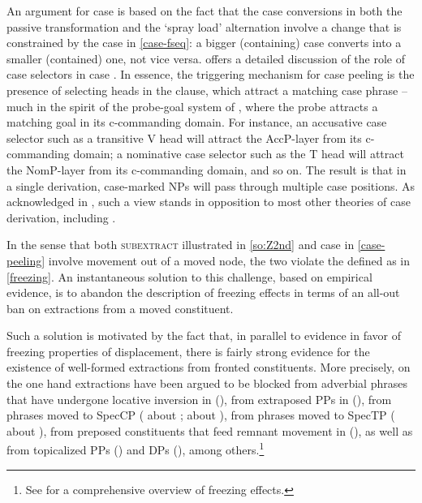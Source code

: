 \vskip -1cm

\noindent An argument for case  is based on the fact that the case conversions in both the passive transformation and the  `spray load' alternation involve a change that is constrained by the case  in \ref{case-fseq}: a bigger (containing) case converts into a smaller (contained) one, not vice versa. \citet[143--146]{Caha2009} offers a detailed discussion of the role of case selectors in case . In essence, the triggering mechanism for case peeling is the presence of selecting heads in the clause, which attract a matching case phrase -- much in the spirit of the probe-goal system of \cite{Chomsky2000}, where the probe attracts a matching goal in its c-commanding domain. For instance, an accusative case selector such as a transitive V head will attract the AccP-layer from its c-commanding domain; a nominative case selector such as the T head will attract the NomP-layer from its c-commanding domain, and so on. The result is that in a single derivation, case-marked NPs will pass through multiple case positions.  As acknowledged in \citet[146]{Caha2009}, such a view stands in opposition to most other theories of case derivation, including \cite{Chomsky2000}. 
\par
In the sense that both \textsc{subextract} illustrated in \ref{so:Z2nd} and case  in \ref{case-peeling} involve movement out of a moved node, the two violate the  defined as in \ref{freezing}. An instantaneous solution to this challenge, based on empirical evidence, is to abandon the description of freezing effects in terms of an all-out ban on extractions from a moved constituent. 
\par
Such a solution is motivated by the fact that, in parallel to evidence in favor of freezing properties of displacement, there is fairly strong evidence for the existence of well-formed extractions from fronted constituents. More precisely, on the one hand extractions have been argued to be blocked from adverbial phrases that have undergone locative inversion in  (\citealt{Huy1976}), from extraposed PPs in  (\citealt{Wexler-Culicover1980}), from phrases moved to SpecCP (\citealt{LS1992} about ;  \citealt{Fanselow1987,Grewendorf1989,Muller1998,Muller2010} about ), from phrases moved to SpecTP (\citealt{Browning1991,Collins1994,BG2007} about ), from preposed constituents that feed remnant movement in  (\citealt{Muller1998}), as well as from  topicalized PPs (\citealt{Postal1972}) and DPs (\citealt{LS1992}), among others.\footnote{See \cite{Corver2017} for a comprehensive overview of freezing effects. 
} %
